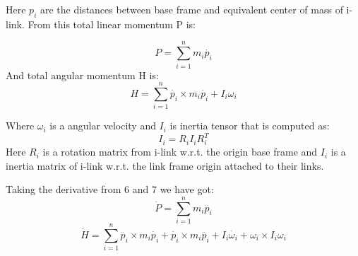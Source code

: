\documentclass[11pt,a4paper]{report}
\begin{document}
Here $p_i$ are the distances between base frame and equivalent center of mass of i-link. From this total linear momentum P is:
	
	\begin{equation}
		P = \sum^n_{i=1}{m_i \dot{p_i}}
	\end{equation}
And total angular momentum H is:
	\begin{equation}
		H = \sum^n_{i=1}{\dot{p_i} \times m_i \dot{p_i} + I_i \omega_i}
	\end{equation}

Where $\omega_i$ is a angular velocity and $I_i$ is inertia tensor that is computed as:
	\begin{equation}
		I_i = R_i I_i R_i^T
	\end{equation}
Here $R_i$ is a rotation matrix from i-link w.r.t. the origin base frame and $I_i$ is a inertia matrix of i-link w.r.t. the link frame origin attached to their links.

Taking the derivative from 6 and 7 we have got:
	\begin{equation}
		\dot{P} = \sum^n_{i=1}{m_i \ddot{p_i}}
	\end{equation}
	\begin{equation}
		\dot{H} = \sum^n_{i=1}{\ddot{p_i} \times m_i \dot{p_i} + \dot{p_i} \times m_i \ddot{p_i} + I_i \dot{\omega_i}} + \omega_i \times I_i \omega_i
	\end{equation}
\end{document}
